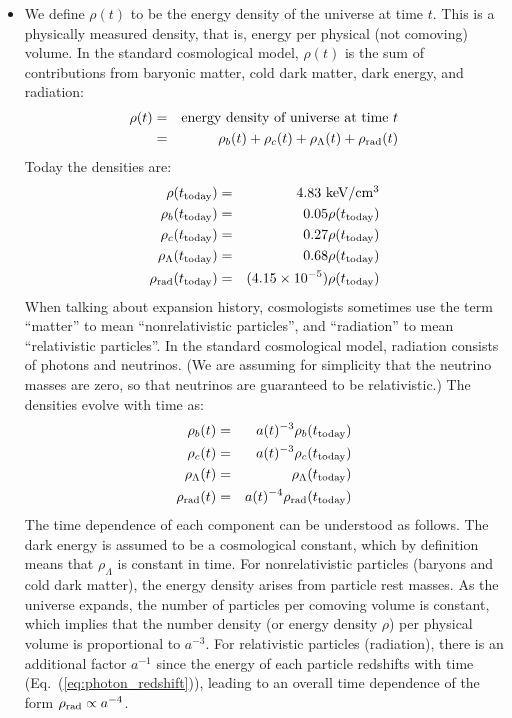 \documentclass[aps,prd,superscriptaddress,groupedaddress,nofootinbib,nobibnotes]{revtex4}
\newcommand{\ba}{\begin{eqnarray}}
\newcommand{\ea}{\end{eqnarray}}
\newcommand{\nn}{\nonumber}
\begin{document}
\begin{itemize}
\item
We define $\rho(t)$ to be the energy density of the universe at time $t$.
This is a physically measured density, that is, energy per physical (not comoving) volume.
In the standard cosmological model, $\rho(t)$ is the sum of contributions from baryonic matter,
cold dark matter, dark energy, and radiation:
\ba
\rho(t) &=& \mbox{energy density of universe at time $t$} \nn \\
 &=& \rho_b(t) + \rho_c(t) + \rho_\Lambda(t) + \rho_{\rm rad}(t)  \label{eq:lcdm_start}
\ea
Today the densities are:
\ba
\rho(t_{\rm today}) &=& 4.83 \mbox{ keV/cm$^3$}  \\
\rho_b(t_{\rm today}) &=& 0.05 \rho(t_{\rm today})  \\
\rho_c(t_{\rm today}) &=& 0.27 \rho(t_{\rm today})  \\
\rho_\Lambda(t_{\rm today}) &=& 0.68 \rho(t_{\rm today})  \\
\rho_{\rm rad}(t_{\rm today}) &=& (4.15 \times 10^{-5}) \rho(t_{\rm today})
\ea
When talking about expansion history, cosmologists sometimes use the term ``matter''
to mean ``nonrelativistic particles'', and ``radiation'' to mean ``relativistic particles''.
In the standard cosmological model, radiation consists of photons and neutrinos.
(We are assuming for simplicity that the neutrino masses are zero, so that neutrinos are
guaranteed to be relativistic.)
The densities evolve with time as:
\ba
\rho_b(t) &=& a(t)^{-3} \rho_b(t_{\rm today}) \\
\rho_c(t) &=& a(t)^{-3} \rho_c(t_{\rm today}) \\
\rho_\Lambda(t) &=& \rho_\Lambda(t_{\rm today}) \\
\rho_{\rm rad}(t) &=& a(t)^{-4} \rho_{\rm rad}(t_{\rm today})  \label{eq:lcdm_end}
\ea
The time dependence of each component can be understood as follows.
The dark energy is assumed to be a cosmological constant, which by definition
means that $\rho_\Lambda$ is constant in time.
For nonrelativistic particles (baryons and cold dark matter), the energy density
arises from particle rest masses.  As the universe expands,
the number of particles per comoving volume is constant, which implies that the number
density (or energy density $\rho$) per physical volume is proportional to $a^{-3}$.
For relativistic particles (radiation), there is an additional factor $a^{-1}$
since the energy of each particle redshifts with time (Eq.~(\ref{eq:photon_redshift})),
leading to an overall time dependence of the form $\rho_{\rm rad} \propto a^{-4}$.


\end{itemize}
\end{document}
